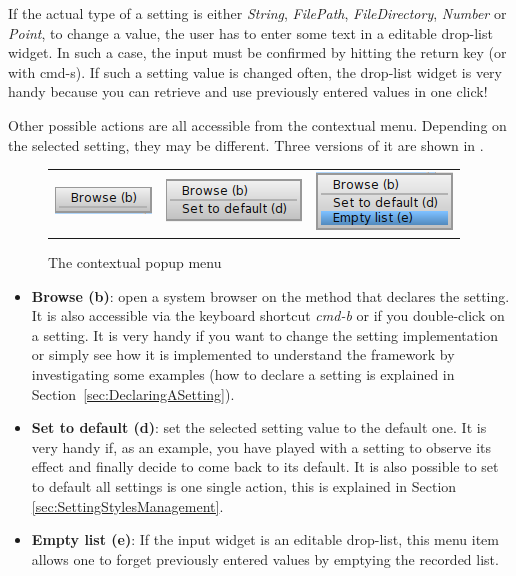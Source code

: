 \documentclass[a4paper,10pt,twoside]{book}
\begin{document}
If the actual type of a setting is either \textit{String}, \textit{FilePath}, \textit{FileDirectory}, \textit{Number} or \textit{Point},  to change a value, the user has to enter some text in a editable drop-list widget. In such a case, the input must be confirmed by hitting the return key (or with cmd-s). If such a setting value is changed often, the drop-list widget is very handy because you can retrieve and use previously entered values in one click!

Other possible actions are all accessible from the contextual menu.
Depending on the selected setting, they may be different. Three versions of it are shown in .
\begin{figure}[tbh]
\begin{center}
\begin{tabular}{ccc}
\includegraphics[scale=0.5]{popup0.png} & 
	\includegraphics[scale=0.5]{popup1.png} & 
	\includegraphics[scale=0.5]{popup2.png} \\ 
\end{tabular} 
\caption{The contextual popup menu}
\end{center}
\end{figure}
\begin{itemize}
\item \textbf{Browse (b)}: open a system browser on the method that declares the setting. It is also accessible via the keyboard shortcut \textit{cmd-b} or if you double-click on a setting. It is very handy if you want to change the setting implementation or simply see how it is implemented to understand the framework by investigating some examples (how to declare a setting is explained in Section~\ref{sec:DeclaringASetting}).
\item \textbf{Set to default (d)}: set the selected setting value to the default one. It is very handy if, as an example, you have played with a setting to observe its effect and finally decide to come back to its default. It is also possible to set to default all settings is one single action, this is explained in Section \ref{sec:SettingStylesManagement}.
\item \textbf{Empty list (e)}: If the input widget is an editable drop-list, this menu item allows one to forget previously entered values by emptying the recorded list.
\end{itemize}
\end{document}
